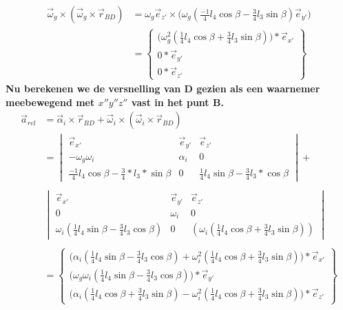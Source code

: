 \documentclass[a4paper,10pt]{article}
\begin{document}
\begin{equation}
	\begin{aligned}
	\vec{\omega}_g \times (\vec{\omega}_g \times \vec{r}_{BD}) &= \omega_g \vec{e}_{z'} \times \Big(\omega_g (\frac{-1}{4} l_4 \cos{\beta}-\frac{3}{4} l_3 \sin{\beta})\vec{e}_{y'}\Big)\\
	& = \begin{Bmatrix}
	\Big(\omega_{g}^{2} (\frac{1}{4} l_4 \cos{\beta}+\frac{3}{4} l_3 \sin{\beta})\Big) * \vec{e}_{x'}\\
	0*\vec{e}_{y'}\\
	0*\vec{e}_{z'}
	\end{Bmatrix}
	\end{aligned}
\end{equation}
\textbf{Nu berekenen we de versnelling van D gezien als een waarnemer meebewegend met $x''y''z''$ vast in het punt B.}
\begin{equation}
	\begin{aligned}
	\vec{a}_{rel} &= \vec{\alpha}_i \times \vec{r}_{BD} + \vec{\omega}_i \times(\vec{\omega}_i \times \vec{r}_{BD})\\
	&= \begin{vmatrix}
	\vec{e}_{x'} & \vec{e}_{y'} & \vec{e}_{z'}\\
	-\omega_g\omega_i & \alpha_i & 0 \\
	\frac{-1}{4} l_4 \cos{\beta} - \frac{3}{4}*l_3 * \sin{\beta} & 0 &\frac{1}{4} l_4 \sin{\beta}-\frac{3}{4} l_3 * \cos{\beta}
	\end{vmatrix} + \\
	\\
	&\begin{vmatrix}
	\vec{e}_{x'} & \vec{e}_{y'} & \vec{e}_{z'}\\
	0 & \omega_i & 0 \\
	\omega_i (\frac{1}{4} l_4 \sin{\beta}-\frac{3}{4} l_3  \cos{\beta}) & 0 &(\omega_i (\frac{1}{4} l_4 \cos{\beta} + \frac{3}{4} l_3  \sin{\beta}))
	\end{vmatrix}\\
	\\
	&= \begin{Bmatrix}
	\Big(\alpha_i(\frac{1}{4} l_4  \sin{\beta}-\frac{3}{4} l_3  \cos{\beta}) + \omega_i^2 (\frac{1}{4} l_4 \cos{\beta} + \frac{3}{4} l_3  \sin{\beta})\Big)*\vec{e}_{x'}\\
	\Big(\omega_g\omega_i(\frac{1}{4} l_4  \sin{\beta}-\frac{3}{4} l_3  \cos{\beta})\Big)*\vec{e}_{y'}\\
	\Big(\alpha_i (\frac{1}{4} l_4 \cos{\beta} + \frac{3}{4} l_3 \sin{\beta}) - \omega_i^2(\frac{1}{4} l_4 \cos{\beta} + \frac{3}{4} l_3  \sin{\beta})\Big)*\vec{e}_{z'}
	\end{Bmatrix}
	\end{aligned}
\end{equation}
\end{document}
